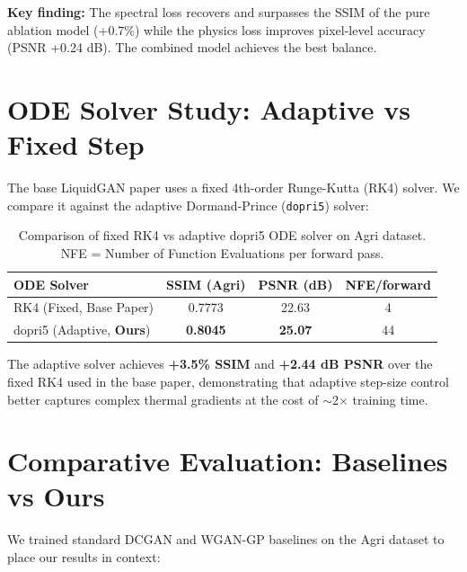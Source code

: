 \documentclass[12pt,a4paper]{report}
\begin{document}
\noindent \textbf{Key finding:} The spectral loss recovers and surpasses the SSIM of the pure ablation model (+0.7\%) while the physics loss improves pixel-level accuracy (PSNR +0.24 dB). The combined model achieves the best balance.

\section{ODE Solver Study: Adaptive vs Fixed Step}
The base LiquidGAN paper uses a fixed 4th-order Runge-Kutta (RK4) solver. We compare it against the adaptive Dormand-Prince (\texttt{dopri5}) solver:

\begin{table}[h]
\centering
\begin{tabular}{lccc}
\toprule
\textbf{ODE Solver} & \textbf{SSIM (Agri)} & \textbf{PSNR (dB)} & \textbf{NFE/forward} \\
\midrule
RK4 (Fixed, Base Paper)          & 0.7773 & 22.63 & 4  \\
dopri5 (Adaptive, \textbf{Ours}) & \textbf{0.8045} & \textbf{25.07} & 44 \\
\bottomrule
\end{tabular}
\caption{Comparison of fixed RK4 vs adaptive dopri5 ODE solver on Agri dataset. NFE = Number of Function Evaluations per forward pass.}
\label{tab:ode}
\end{table}

\noindent The adaptive solver achieves \textbf{+3.5\% SSIM} and \textbf{+2.44 dB PSNR} over the fixed RK4 used in the base paper, demonstrating that adaptive step-size control better captures complex thermal gradients at the cost of $\sim$2$\times$ training time.

\section{Comparative Evaluation: Baselines vs Ours}
We trained standard DCGAN and WGAN-GP baselines on the Agri dataset to place our results in context:
\end{document}
